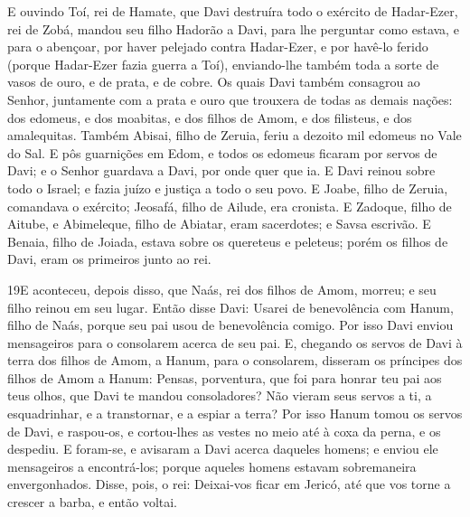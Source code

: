 E ouvindo Toí, rei de Hamate, que Davi destruíra todo o exército
de Hadar-Ezer, rei de Zobá, mandou seu filho Hadorão a Davi,
para lhe perguntar como estava, e para o abençoar, por haver
pelejado contra Hadar-Ezer, e por havê-lo ferido (porque Hadar-Ezer
fazia guerra a Toí), enviando-lhe também toda a sorte de vasos de
ouro, e de prata, e de cobre. Os quais Davi também consagrou
ao Senhor, juntamente com a prata e ouro que trouxera de todas as
demais nações: dos edomeus, e dos moabitas, e dos filhos de Amom, e
dos filisteus, e dos amalequitas. Também Abisai, filho de
Zeruia, feriu a dezoito mil edomeus no Vale do Sal. E pôs
guarnições em Edom, e todos os edomeus ficaram por servos de Davi; e
o Senhor guardava a Davi, por onde quer que ia. E Davi reinou
sobre todo o Israel; e fazia juízo e justiça a todo o seu povo.
E Joabe, filho de Zeruia, comandava o exército; Jeosafá,
filho de Ailude, era cronista. E Zadoque, filho de Aitube, e
Abimeleque, filho de Abiatar, eram sacerdotes; e Savsa escrivão.
E Benaia, filho de Joiada, estava sobre os quereteus e
peleteus; porém os filhos de Davi, eram os primeiros junto ao rei.

\medskip

\lettrine{19} E aconteceu, depois disso, que Naás, rei dos
filhos de Amom, morreu; e seu filho reinou em seu lugar. Então
disse Davi: Usarei de benevolência com Hanum, filho de Naás, porque
seu pai usou de benevolência comigo. Por isso Davi enviou
mensageiros para o consolarem acerca de seu pai. E, chegando os
servos de Davi à terra dos filhos de Amom, a Hanum, para o
consolarem, disseram os príncipes dos filhos de Amom a Hanum:
Pensas, porventura, que foi para honrar teu pai aos teus olhos, que
Davi te mandou consoladores? Não vieram seus servos a ti, a
esquadrinhar, e a transtornar, e a espiar a terra? Por isso
Hanum tomou os servos de Davi, e raspou-os, e cortou-lhes as vestes
no meio até à coxa da perna, e os despediu. E foram-se, e
avisaram a Davi acerca daqueles homens; e enviou ele mensageiros a
encontrá-los; porque aqueles homens estavam sobremaneira
envergonhados. Disse, pois, o rei: Deixai-vos ficar em Jericó, até
que vos torne a crescer a barba, e então voltai.

